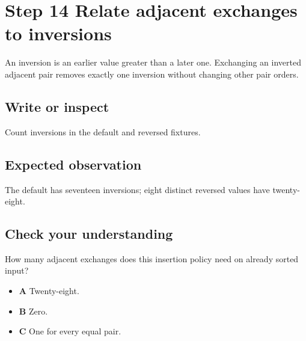 \section{Step 14 Relate adjacent exchanges to
  inversions}\label{009-sorting-visualizer-s14-step-14-relate-adjacent-exchanges-to-inversions}

An inversion is an earlier value greater than a later one. Exchanging an
inverted adjacent pair removes exactly one inversion without changing
other pair orders.

\subsection{Write or
  inspect}\label{009-sorting-visualizer-s14-write-or-inspect}

Count inversions in the default and reversed fixtures.

\subsection{Expected
  observation}\label{009-sorting-visualizer-s14-expected-observation}

The default has seventeen inversions; eight distinct reversed values
have twenty-eight.

\subsection{Check your
  understanding}\label{009-sorting-visualizer-s14-check-your-understanding}

How many adjacent exchanges does this insertion policy need on already
sorted input?

\begin{itemize}
  \tightlist
  \item
        \textbf{A} Twenty-eight.
  \item
        \textbf{B} Zero.
  \item
        \textbf{C} One for every equal pair.
\end{itemize}
